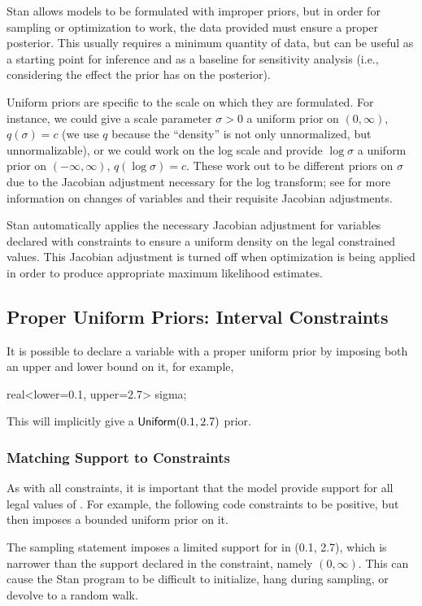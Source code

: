 Stan allows models to be formulated with improper priors, but in order
for sampling or optimization to work, the data provided must ensure a
proper posterior.  This usually requires a minimum quantity of data,
but can be useful as a starting point for inference and as a baseline
for sensitivity analysis (i.e., considering the effect the prior
has on the posterior).

Uniform priors are specific to the scale on which they are formulated.
For instance, we could give a scale parameter $\sigma > 0$ a uniform
prior on $(0,\infty)$, $q(\sigma) = c$ (we use $q$ because the
``density'' is not only unnormalized, but unnormalizable), or we could
work on the log scale and provide $\log \sigma$ a uniform prior on
$(-\infty,\infty)$, $q(\log \sigma) = c$.  These work out to be
different priors on $\sigma$ due to the Jacobian adjustment necessary
for the log transform; see  for more
information on changes of variables and their requisite Jacobian
adjustments.

Stan automatically applies the necessary Jacobian adjustment for
variables declared with constraints to ensure a uniform density on the
legal constrained values.  This Jacobian adjustment is turned off when
optimization is being applied in order to produce appropriate maximum
likelihood estimates.

\subsection{Proper Uniform Priors: Interval Constraints}

It is possible to declare a variable with a proper uniform prior by
imposing both an upper and lower bound on it, for example,
%
\begin{stancode}
real<lower=0.1, upper=2.7> sigma;
\end{stancode}
%
This will implicitly give  a $\distro{Uniform}(0.1, 2.7)$
prior.  

\subsubsection{Matching Support to Constraints}

As with all constraints, it is important that the model
provide support for all legal values of .  For example,
the following code constraints  to be positive, but then
imposes a bounded uniform prior on it.
%
\begin{stancode}
parameters {
  real<lower=0> sigma;
  ...
model {
  // *** bad *** : support narrower than constraint
  sigma ~ uniform(0.1, 2.7);  
\end{stancode}
%
The sampling statement imposes a limited support for  in
(0.1, 2.7), which is narrower than the support declared in the
constraint, namely $(0, \infty)$.  This can cause the Stan program to
be difficult to initialize, hang during sampling, or devolve to a
random walk.

